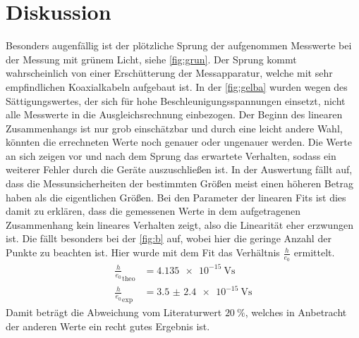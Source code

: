 \section{Diskussion}
\label{sec:Diskussion}
Besonders augenfällig ist der plötzliche Sprung der aufgenommen Messwerte bei der Messung mit grünem Licht, siehe \autoref{fig:grun}.
Der Sprung kommt wahrscheinlich von einer Erschütterung der Messapparatur, welche mit sehr empfindlichen Koaxialkabeln aufgebaut ist.
In der \autoref{fig:gelba} wurden wegen des Sättigungswertes, der sich für hohe Beschleunigungsspannungen einsetzt, nicht alle Messwerte in die Ausgleichsrechnung einbezogen.
Der Beginn des linearen Zusammenhangs ist nur grob einschätzbar und durch eine leicht andere Wahl, könnten die errechneten Werte noch genauer oder ungenauer werden.
Die Werte an sich zeigen vor und nach dem Sprung das erwartete Verhalten, sodass ein weiterer Fehler durch die Geräte auszuschließen ist.
In der Auswertung fällt auf, dass die Messunsicherheiten der bestimmten Größen meist einen höheren Betrag haben als die eigentlichen Größen. 
Bei den Parameter der linearen Fits ist dies damit zu erklären, dass die gemessenen Werte in dem aufgetragenen Zusammenhang kein lineares Verhalten zeigt, also die Linearität eher erzwungen ist.
Die fällt besonders bei der \autoref{fig:b} auf, wobei hier die geringe Anzahl der Punkte zu beachten ist. 
Hier wurde mit dem Fit das Verhältnis $\frac{h}{e_0}$ ermittelt. 
\begin{align*}
    \frac{h}{e_0}_{\text{theo}} &= \SI{4.135e-15}{\volt\second}\\
    \frac{h}{e_0}_{\text{exp}} &= \SI{3.5(24)e-15}{\volt\second}
\end{align*} 
Damit beträgt die Abweichung vom Literaturwert $\SI{20}{\percent}$, welches in Anbetracht der anderen Werte ein recht gutes Ergebnis ist.

